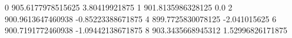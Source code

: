 0 905.6177978515625 3.80419921875
1 901.8135986328125 0.0
2 900.9613647460938 -0.85223388671875
4 899.7725830078125 -2.041015625
6 900.7191772460938 -1.09442138671875
8 903.3435668945312 1.52996826171875
